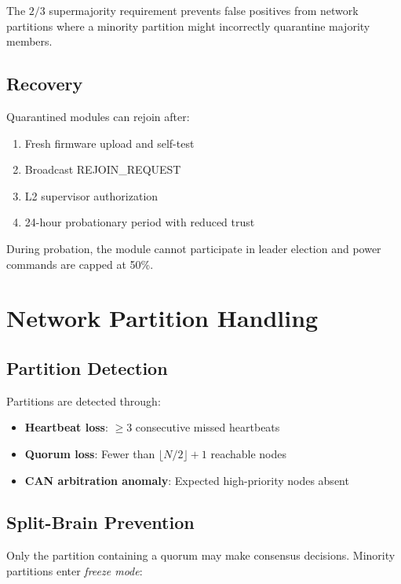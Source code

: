 \documentclass[conference,10pt]{IEEEtran}
\begin{document}
The $2/3$ supermajority requirement prevents false positives from network partitions where a minority partition might incorrectly quarantine majority members.

\subsection{Recovery}

Quarantined modules can rejoin after:
\begin{enumerate}
    \item Fresh firmware upload and self-test
    \item Broadcast REJOIN\_REQUEST
    \item L2 supervisor authorization
    \item 24-hour probationary period with reduced trust
\end{enumerate}

During probation, the module cannot participate in leader election and power commands are capped at 50\%.

\section{Network Partition Handling}
\label{sec:partition}

\subsection{Partition Detection}

Partitions are detected through:
\begin{itemize}
    \item \textbf{Heartbeat loss}: $\geq 3$ consecutive missed heartbeats
    \item \textbf{Quorum loss}: Fewer than $\lfloor N/2 \rfloor + 1$ reachable nodes
    \item \textbf{CAN arbitration anomaly}: Expected high-priority nodes absent
\end{itemize}

\subsection{Split-Brain Prevention}

Only the partition containing a quorum may make consensus decisions. Minority partitions enter \textit{freeze mode}:
\end{document}
